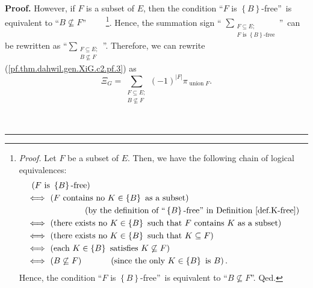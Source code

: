 \documentclass[numbers=enddot,12pt,final,onecolumn,notitlepage]{scrartcl}%
\theoremstyle{definition}
\newenvironment{proof}[1][Proof]{\noindent\textbf{#1.} }{\ \rule{0.5em}{0.5em}}
\newenvironment{verlong}{}{}
\let\sumnonlimits\sum
\renewcommand{\sum}{\sumnonlimits\limits}
\begin{document}
\begin{proof}
\begin{verlong}
However, if $F$ is a subset of $E$, then the condition \textquotedblleft$F$ is
$\left\{  B\right\}  $-free\textquotedblright\ is equivalent to
\textquotedblleft$B\not \subseteq F$\textquotedblright%
\ \ \ \ \footnote{\textit{Proof.} Let $F$ be a subset of $E$. Then, we have
the following chain of logical equivalences:%
\begin{align*}
&  \ \left(  F\text{ is }\left\{  B\right\}  \text{-free}\right) \\
&  \Longleftrightarrow\ \left(  F\text{ contains no }K\in\left\{  B\right\}
\text{ as a subset}\right) \\
&  \ \ \ \ \ \ \ \ \ \ \ \ \ \ \ \ \ \ \ \ \left(  \text{by the definition of
\textquotedblleft}\left\{  B\right\}  \text{-free\textquotedblright\ in
Definition \ref{def.K-free}}\right) \\
&  \Longleftrightarrow\ \left(  \text{there exists no }K\in\left\{  B\right\}
\text{ such that }F\text{ contains }K\text{ as a subset}\right) \\
&  \Longleftrightarrow\ \left(  \text{there exists no }K\in\left\{  B\right\}
\text{ such that }K\subseteq F\right) \\
&  \Longleftrightarrow\ \left(  \text{each }K\in\left\{  B\right\}  \text{
satisfies }K\not \subseteq F\right) \\
&  \Longleftrightarrow\ \left(  B\not \subseteq F\right)
\ \ \ \ \ \ \ \ \ \ \left(  \text{since the only }K\in\left\{  B\right\}
\text{ is }B\right)  .
\end{align*}
Hence, the condition \textquotedblleft$F$ is $\left\{  B\right\}
$-free\textquotedblright\ is equivalent to \textquotedblleft$B\not \subseteq
F$\textquotedblright. Qed.}. Hence, the summation sign \textquotedblleft%
$\sum_{\substack{F\subseteq E;\\F\text{ is }\left\{  B\right\}  \text{-free}%
}}$\textquotedblright\ can be rewritten as \textquotedblleft$\sum
_{\substack{F\subseteq E;\\B\not \subseteq F}}$\textquotedblright. Therefore,
we can rewrite (\ref{pf.thm.dahwil.gen.XiG.c2.pf.3}) as%
\begin{equation}
\Xi_{G}=\sum_{\substack{F\subseteq E;\\B\not \subseteq F}}\left(  -1\right)
^{\left\vert F\right\vert }\pi_{\operatorname*{union}F}.
\label{pf.thm.dahwil.gen.XiG.c2.pf.4}%
\end{equation}



\end{verlong}
\end{proof}
\end{document}
